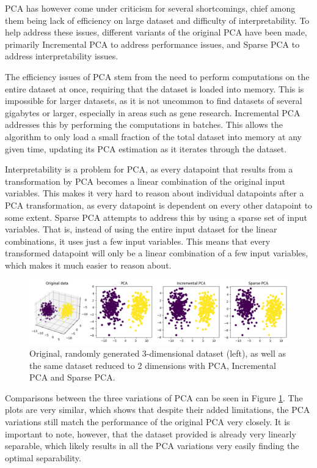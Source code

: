 PCA has however come under criticism for several shortcomings, chief among them being lack of efficiency on large dataset and difficulty of interpretability. To help address these issues, different variants of the original PCA have been made, primarily Incremental PCA to address performance issues, and Sparse PCA to address interpretability issues.

The efficiency issues of PCA stem from the need to perform computations on the entire dataset at once, requiring that the dataset is loaded into memory. This is impossible for larger datasets, as it is not uncommon to find datasets of several gigabytes or larger, especially in areas such as gene research. Incremental PCA addresses this by performing the computations in batches. This allows the algorithm to only load a small fraction of the total dataset into memory at any given time, updating its PCA estimation as it iterates through the dataset.

Interpretability is a problem for PCA, as every datapoint that results from a transformation by PCA becomes a linear combination of the original input variables. This makes it very hard to reason about individual datapoints after a PCA transformation, as every datapoint is dependent on every other datapoint to some extent. Sparse PCA attempts to address this by using a sparse set of input variables. That is, instead of using the entire input dataset for the linear combinations, it uses just a few input variables. This means that every transformed datapoint will only be a linear combination of a few input variables, which makes it much easier to reason about. 

\begin{figure}
    \centering
    \includegraphics[width=1\linewidth]{images/pca.png}
    \caption{Original, randomly generated 3-dimensional dataset (left), as well as the same dataset reduced to 2 dimensions with PCA, Incremental PCA and Sparse PCA.}
    \label{fig:pca}
\end{figure}

Comparisons between the three variations of PCA can be seen in Figure \ref{fig:pca}. The plots are very similar, which shows that despite their added limitations, the PCA variations still match the performance of the original PCA very closely. It is important to note, however, that the dataset provided is already very linearly separable, which likely results in all the PCA variations very easily finding the optimal separability.


